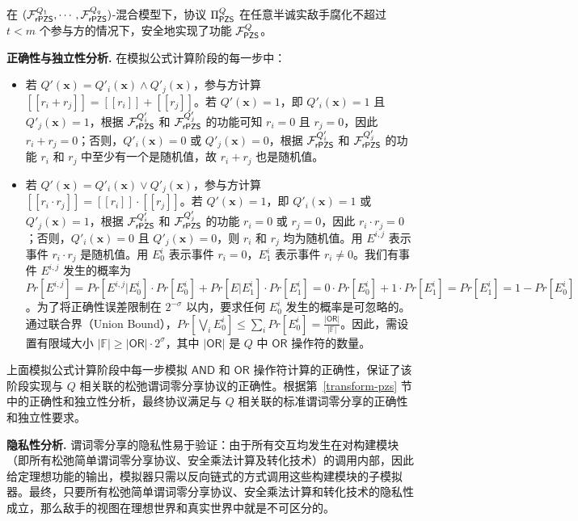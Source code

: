 \begin{theorem}\label{theorem:cpzs}
在 $(\mathcal{F}_\mathsf{rPZS}^{Q_1},\cdots, \mathcal{F}_\mathsf{rPZS}^{Q_q})$-混合模型下，协议 $\Pi_\mathsf{PZS}^Q$ 在任意半诚实敌手腐化不超过 $t < m$ 个参与方的情况下，安全地实现了功能 $\mathcal{F}_\mathsf{PZS}^Q$。
\end{theorem}

\begin{trivlist}
\item \textbf{正确性与独立性分析.} 在模拟公式计算阶段的每一步中：
\begin{itemize}[itemsep=2pt,topsep=5pt,parsep=0pt,leftmargin=10pt]
    \item 若 $Q'(\textbf{x}) = Q'_i(\textbf{x}) \land Q'_j(\textbf{x})$，参与方计算 $[\! [ r_i + r_j ] \!] = [\! [ r_i ] \!] + [\! [ r_j ] \!]$。若 $Q'(\textbf{x}) = 1$，即 $Q'_i(\textbf{x}) = 1$ 且 $Q'_j(\textbf{x}) = 1$，根据 $\mathcal{F}_\mathsf{rPZS}^{Q'_i}$ 和 $\mathcal{F}_\mathsf{rPZS}^{Q'_j}$ 的功能可知 $r_i = 0$ 且 $r_j = 0$，因此 $r_i + r_j = 0$；否则，$Q'_i(\textbf{x}) = 0$ 或 $Q'_j(\textbf{x}) = 0$，根据 $\mathcal{F}_\mathsf{rPZS}^{Q'_i}$ 和 $\mathcal{F}_\mathsf{rPZS}^{Q'_j}$ 的功能 $r_i$ 和 $r_j$ 中至少有一个是随机值，故 $r_i + r_j$ 也是随机值。
    \item 若 $Q'(\textbf{x}) = Q'_i(\textbf{x}) \lor Q'_j(\textbf{x})$，参与方计算 $[\! [ r_i \cdot r_j ] \!] = [\! [ r_i ] \!] \cdot [\! [ r_j ] \!]$。若 $Q'(\textbf{x}) = 1$，即 $Q'_i(\textbf{x}) = 1$ 或 $Q'_j(\textbf{x}) = 1$，根据 $\mathcal{F}_\mathsf{rPZS}^{Q'_i}$ 和 $\mathcal{F}_\mathsf{rPZS}^{Q'_j}$ 的功能 $r_i = 0$ 或 $r_j = 0$，因此 $r_i \cdot r_j = 0$；否则，$Q'_i(\textbf{x}) = 0$ 且 $Q'_j(\textbf{x}) = 0$，则 $r_i$ 和 $r_j$ 均为随机值。用 $E^{i,j}$ 表示事件 $r_i \cdot r_j$ 是随机值。用 $E_0^{i}$ 表示事件 $r_i = 0$，$E_1^{i}$ 表示事件 $r_i \ne 0$。我们有事件 $E^{i,j}$ 发生的概率为 $Pr[E^{i,j}] = Pr[E^{i,j} \vert E_0^{i}] \cdot Pr[E_0^{i}] + Pr[E \vert E_1^{i}] \cdot Pr[E_1^{i}] = 0 \cdot Pr[E_0^{i}] + 1 \cdot Pr[E_1^{i}] = Pr[E_1^{i}] = 1- Pr[E_0^{i}]$。为了将正确性误差限制在 $2^{-\sigma}$ 以内，要求任何 $E_0^{i}$ 发生的概率是可忽略的。通过联合界（Union Bound），$Pr[\bigvee_i E_0^{i}] \le \sum_{i} Pr[E_0^{i}] = \frac{\lvert \mathsf{OR} \rvert}{\lvert \mathbb{F} \rvert}$。因此，需设置有限域大小 $\lvert \mathbb{F} \rvert \ge \lvert \mathsf{OR} \rvert \cdot 2^\sigma$，其中 $\lvert \mathsf{OR} \rvert$ 是 $Q$ 中 $\mathsf{OR}$ 操作符的数量。
\end{itemize}
上面模拟公式计算阶段中每一步模拟 $\mathsf{AND}$ 和 $\mathsf{OR}$ 操作符计算的正确性，保证了该阶段实现与 $Q$ 相关联的松弛谓词零分享协议的正确性。根据第~\ref{transform-pzs} 节中的正确性和独立性分析，最终协议满足与 $Q$ 相关联的标准谓词零分享的正确性和独立性要求。
\item \textbf{隐私性分析.} 谓词零分享的隐私性易于验证：由于所有交互均发生在对构建模块（即所有松弛简单谓词零分享协议、安全乘法计算及转化技术）的调用内部，因此给定理想功能的输出，模拟器只需以反向链式的方式调用这些构建模块的子模拟器。最终，只要所有松弛简单谓词零分享协议、安全乘法计算和转化技术的隐私性成立，那么敌手的视图在理想世界和真实世界中就是不可区分的。
\end{trivlist}

